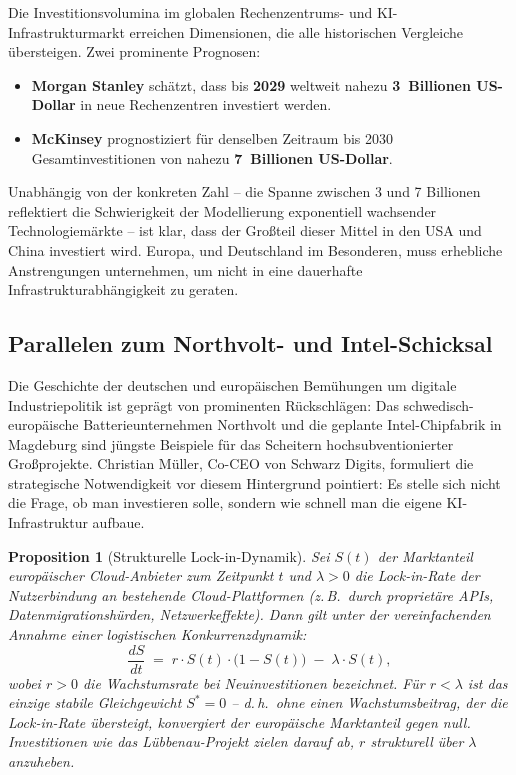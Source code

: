 \documentclass[12pt, a4paper, openany]{report}
\newtheorem{proposition}[theorem]{Proposition}
\begin{document}
Die Investitionsvolumina im globalen Rechenzentrums- und KI-Infrastrukturmarkt
erreichen Dimensionen, die alle historischen Vergleiche übersteigen. Zwei
prominente Prognosen:

\begin{itemize}[leftmargin=2em]
	\item \textbf{Morgan Stanley} schätzt, dass bis \textbf{2029} weltweit
	nahezu \textbf{3~Billionen US-Dollar} in neue Rechenzentren investiert
	werden.
	\item \textbf{McKinsey} prognostiziert für denselben Zeitraum bis 2030
	Gesamtinvestitionen von nahezu \textbf{7~Billionen US-Dollar}.
\end{itemize}

\noindent
Unabhängig von der konkreten Zahl -- die Spanne zwischen 3 und 7 Billionen
reflektiert die Schwierigkeit der Modellierung exponentiell wachsender
Technologiemärkte -- ist klar, dass der Großteil dieser Mittel in den USA
und China investiert wird. Europa, und Deutschland im Besonderen, muss
erhebliche Anstrengungen unternehmen, um nicht in eine dauerhafte
Infrastrukturabhängigkeit zu geraten.

\subsection{Parallelen zum Northvolt- und Intel-Schicksal}

Die Geschichte der deutschen und europäischen Bemühungen um digitale
Industriepolitik ist geprägt von prominenten Rückschlägen: Das
schwedisch-europäische Batterieunternehmen Northvolt und die geplante
Intel-Chipfabrik in Magdeburg sind jüngste Beispiele für das Scheitern
hochsubventionierter Großprojekte. Christian Müller, Co-CEO von Schwarz
Digits, formuliert die strategische Notwendigkeit vor diesem Hintergrund
pointiert: Es stelle sich nicht die Frage, ob man investieren solle,
sondern wie schnell man die eigene KI-Infrastruktur aufbaue.

\begin{proposition}[Strukturelle Lock-in-Dynamik]
	\label{prop:lockin}
	Sei $S(t)$ der Marktanteil europäischer Cloud-Anbieter zum Zeitpunkt $t$ und
	$\lambda > 0$ die Lock-in-Rate der Nutzerbindung an bestehende
	Cloud-Plattformen (z.\,B.\ durch proprietäre APIs, Datenmigrationshürden,
	Netzwerkeffekte). Dann gilt unter der vereinfachenden Annahme einer
	logistischen Konkurrenzdynamik:
	\[
	\frac{dS}{dt} \;=\; r \cdot S(t)\cdot\bigl(1 - S(t)\bigr)
	\;-\; \lambda \cdot S(t),
	\]
	wobei $r > 0$ die Wachstumsrate bei Neuinvestitionen bezeichnet.
	Für $r < \lambda$ ist das einzige stabile Gleichgewicht $S^* = 0$ --
	d.\,h.\ ohne einen Wachstumsbeitrag, der die Lock-in-Rate übersteigt,
	konvergiert der europäische Marktanteil gegen null. Investitionen wie
	das Lübbenau-Projekt zielen darauf ab, $r$ strukturell über $\lambda$
	anzuheben.
\end{proposition}
\end{document}
